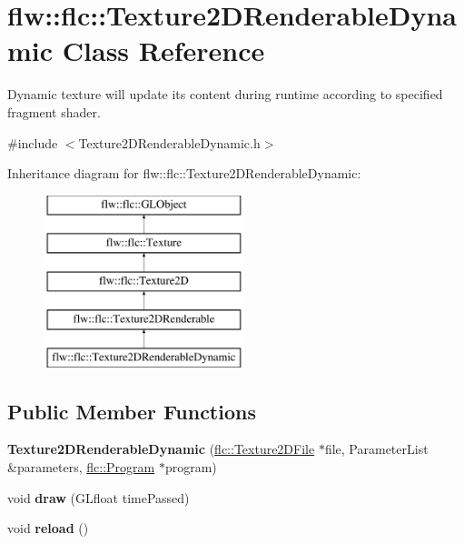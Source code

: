 \hypertarget{classflw_1_1flc_1_1Texture2DRenderableDynamic}{}\section{flw\+:\+:flc\+:\+:Texture2\+D\+Renderable\+Dynamic Class Reference}
\label{classflw_1_1flc_1_1Texture2DRenderableDynamic}


Dynamic texture will update its content during runtime according to specified fragment shader.  




{\ttfamily \#include $<$Texture2\+D\+Renderable\+Dynamic.\+h$>$}

Inheritance diagram for flw\+:\+:flc\+:\+:Texture2\+D\+Renderable\+Dynamic\+:\begin{figure}[H]
\begin{center}
\leavevmode
\includegraphics[height=5.000000cm]{classflw_1_1flc_1_1Texture2DRenderableDynamic}
\end{center}
\end{figure}
\subsection*{Public Member Functions}
\begin{DoxyCompactItemize}
\item 
\mbox{\label{classflw_1_1flc_1_1Texture2DRenderableDynamic_a5d3a317f239d2b1bee20de6c6ec09d39}} 
{\bfseries Texture2\+D\+Renderable\+Dynamic} (\hyperlink{classflw_1_1flc_1_1Texture2DFile}{flc\+::\+Texture2\+D\+File} $\ast$file, Parameter\+List \&parameters, \hyperlink{classflw_1_1flc_1_1Program}{flc\+::\+Program} $\ast$program)
\item 
\mbox{\label{classflw_1_1flc_1_1Texture2DRenderableDynamic_a7b8c3b852997084d8caf4b96b107d5b4}} 
void {\bfseries draw} (G\+Lfloat time\+Passed)
\item 
\mbox{\label{classflw_1_1flc_1_1Texture2DRenderableDynamic_a5339d5ac11f692049605504e3e6c4cc4}} 
void {\bfseries reload} ()
\end{DoxyCompactItemize}
